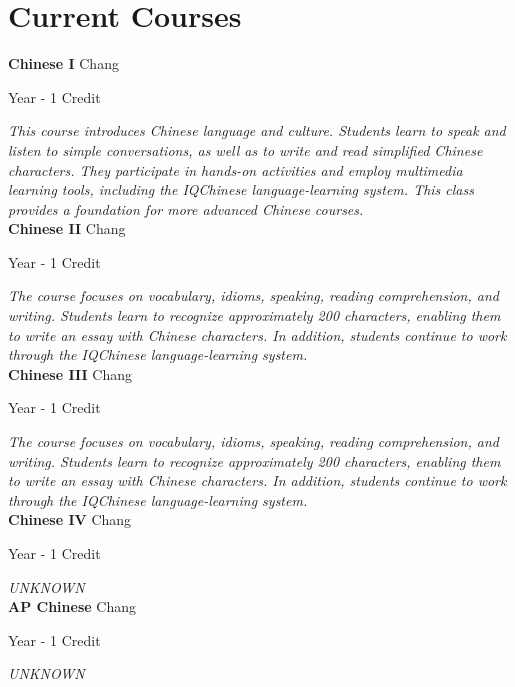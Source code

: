 \section{Current Courses}

\noindent\textbf{Chinese I} \hfill Chang

\noindent Year - 1 Credit

\vspace{1mm}\emph{This course introduces Chinese language and culture.  Students learn to speak and listen to simple conversations, as well as to write and read simplified Chinese characters.  They participate in hands-on activities and employ multimedia learning tools, including the IQChinese language-learning system.  This class provides a foundation for more advanced Chinese courses.}\\


\noindent\textbf{Chinese II} \hfill Chang

\noindent Year - 1 Credit

\vspace{1mm}\emph{The course focuses on vocabulary, idioms, speaking, reading comprehension, and writing.  Students learn to recognize approximately 200 characters, enabling them to write an essay with Chinese characters.  In addition, students continue to work through the IQChinese language-learning system.}\\


\noindent\textbf{Chinese III} \hfill Chang

\noindent Year - 1 Credit

\vspace{1mm}\emph{The course focuses on vocabulary, idioms, speaking, reading comprehension, and writing.  Students learn to recognize approximately 200 characters, enabling them to write an essay with Chinese characters.  In addition, students continue to work through the IQChinese language-learning system.}\\


\noindent\textbf{Chinese IV} \hfill Chang

\noindent Year - 1 Credit

\vspace{1mm}\emph{UNKNOWN}\\


\noindent\textbf{AP Chinese} \hfill Chang

\noindent Year - 1 Credit

\vspace{1mm}\emph{UNKNOWN}\\


